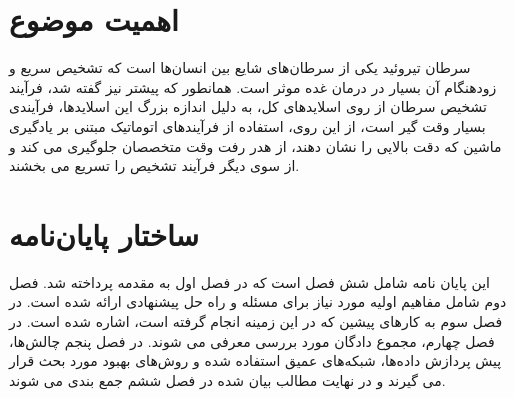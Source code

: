 \section{اهمیت موضوع}\label{sec:اهمیت موضوع}
سرطان تیروئید یکی از سرطان‌های شایع بین انسان‌ها است که تشخیص سریع و زودهنگام آن بسیار در درمان غده موثر است.
همانطور که پیشتر نیز گفته شد، فرآیند تشخیص سرطان از روی اسلاید‌های کل، به دلیل اندازه بزرگ این اسلایدها، فرآیندی بسیار وقت گیر است، از این روی، استفاده از فرآیند‌های اتوماتیک مبتنی بر یادگیری ماشین که دقت بالایی را نشان دهند، از هدر رفت وقت متخصصان جلوگیری می کند و از سوی دیگر فرآیند تشخیص را تسریع می بخشند.


\section{ساختار پایان‌نامه}\label{sec:ساختار پایان‌نامه}
این پایان نامه شامل شش فصل است که در فصل اول به مقدمه پرداخته شد.
فصل دوم شامل مفاهیم اولیه مورد نیاز برای مسئله و راه حل پیشنهادی ارائه شده است.
در فصل سوم به کارهای پیشین که در این زمینه انجام گرفته است، اشاره شده است.
در فصل چهارم، مجموع دادگان مورد بررسی معرفی می شوند.
در فصل پنجم چالش‌ها، پیش پردازش داده‌ها، شبکه‌های عمیق استفاده شده و روش‌های بهبود مورد بحث قرار می گیرند و در نهایت مطالب بیان شده در فصل ششم جمع بندی می شوند.
 


